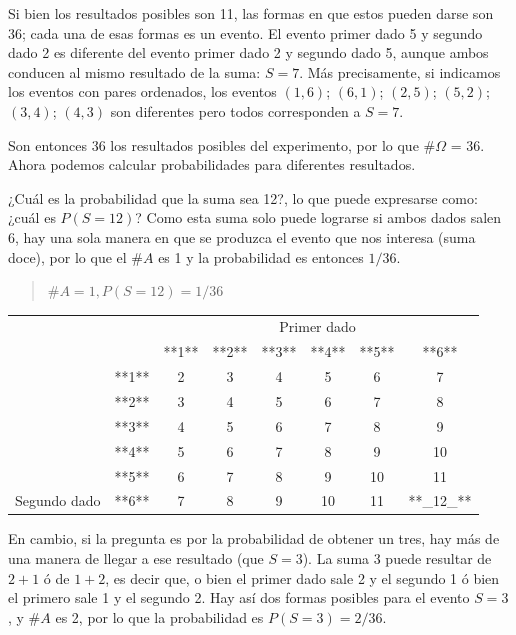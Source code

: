 \documentclass[]{article}
\begin{document}
Si bien los resultados posibles son 11, las formas en que estos pueden
darse son 36; cada una de esas formas es un evento. El evento primer
dado 5 y segundo dado 2 es diferente del evento primer dado 2 y segundo
dado 5, aunque ambos conducen al mismo resultado de la suma: \(S=7\).
Más precisamente, si indicamos los eventos con pares ordenados, los
eventos \((1,6)\); \((6,1)\); \((2,5)\); \((5,2)\); \((3,4)\); \((4,3)\)
son diferentes pero todos corresponden a \(S=7\).

Son entonces 36 los resultados posibles del experimento, por lo que
\(\#\Omega\) = 36. Ahora podemos calcular probabilidades para diferentes
resultados.

¿Cuál es la probabilidad que la suma sea 12?, lo que puede expresarse
como: ¿cuál es \(P(S=12)\)? Como esta suma solo puede lograrse si ambos
dados salen 6, hay una sola manera en que se produzca el evento que nos
interesa (suma doce), por lo que el \(\#A\) es 1 y la probabilidad es
entonces \(1/36\).

\begin{quote}
\(\#A = 1, P(S = 12)=1/36\)
\end{quote}

\begin{table}[H]
\centering
\begin{tabular}{lccccccc}
\toprule
\multicolumn{2}{c}{ } & \multicolumn{6}{c}{Primer dado} \\
\cmidrule(l{3pt}r{3pt}){3-8}
 &  & **1** & **2** & **3** & **4** & **5** & **6**\\
\midrule
\rowcolor{gray!6}   & **1** & 2 & 3 & 4 & 5 & 6 & 7\\
\cmidrule{2-8}
 & **2** & 3 & 4 & 5 & 6 & 7 & 8\\
\cmidrule{2-8}
\rowcolor{gray!6}   & **3** & 4 & 5 & 6 & 7 & 8 & 9\\
\cmidrule{2-8}
 & **4** & 5 & 6 & 7 & 8 & 9 & 10\\
\cmidrule{2-8}
\rowcolor{gray!6}   & **5** & 6 & 7 & 8 & 9 & 10 & 11\\
\cmidrule{2-8}
\multirow[t]{-6}{*}{\raggedright\arraybackslash Segundo dado} & **6** & 7 & 8 & 9 & 10 & 11 & **\_12\_**\\
\bottomrule
\end{tabular}
\end{table}

En cambio, si la pregunta es por la probabilidad de obtener un tres, hay
más de una manera de llegar a ese resultado (que \(S = 3\)). La suma 3
puede resultar de \(2+1\) ó de \(1+2\), es decir que, o bien el primer
dado sale 2 y el segundo 1 ó bien el primero sale 1 y el segundo 2. Hay
así dos formas posibles para el evento \(S = 3\), y \(\#A\) es 2, por lo
que la probabilidad es \(P(S = 3) = 2/36\).
\end{document}
